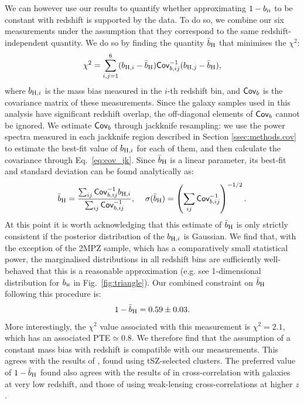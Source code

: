 \documentclass[useAMS,usenatbib]{mn2e}
\def\bH{b_{\scriptscriptstyle\rm H}}
\begin{document}
      We can however use our results to quantify whether approximating $1-\bH$ to be constant with redshift is supported by the data. To do so, we combine our six measurements under the assumption that they correspond to the same redshift-independent quantity. We do so by finding the quantity $\bar{b}_{\rm H}$ that minimises the $\chi^2$:
      \begin{equation}
        \chi^2=\sum_{i,j=1}^6 (b_{{\rm H},i}-\bar{b}_{\rm H}){\sf Cov}^{-1}_{b,ij}(b_{{\rm H},j}-\bar{b}_{\rm H}),
      \end{equation}
      where $b_{{\rm H},i}$ is the mass bias measured in the $i$-th redshift bin, and ${\sf Cov}_b$ is the covariance matrix of these measurements. Since the galaxy samples used in this analysis have significant redshift overlap, the off-diagonal elements of ${\sf Cov}_b$ cannot be ignored. We estimate ${\sf Cov}_b$ through jackknife resampling: we use the power spectra measured in each jackknife region described in Section \ref{ssec:methods.cov} to estimate the best-fit value of $b_{{\rm H},i}$ for each of them, and then calculate the covariance through Eq.\!~\ref{eq:cov_jk}. Since $\bar{b}_{\rm H}$ is a linear parameter, its best-fit and standard deviation can be found analytically as:
      \begin{equation}
        \bar{b}_{\rm H}=\frac{\sum_{ij}{\sf Cov}_{b,ij}^{-1}b_{{\rm H},i}}{\sum_{ij}{\sf Cov}^{-1}_{b,ij}},
        \hspace{12pt}
        \sigma(\bar{b}_{\rm H})=\left(\sum_{ij}{\sf Cov}^{-1}_{b,ij}\right)^{-1/2}.
      \end{equation}
      At this point it is worth acknowledging that this estimate of $\bar{b}_{\rm H}$ is only strictly consistent if the posterior distribution of the $b_{{\rm H},i}$ is Gaussian. We find that, with the exception of the 2MPZ sample, which has a comparatively small statistical power, the marginalised distributions in all redshift bins are sufficiently well-behaved that this is a reasonable approximation (e.g. see 1-dimensional distribution for $\bH$ in Fig.\!~\ref{fig:triangle}). Our combined constraint on $\bar{b}_{\rm H}$ following this procedure is:
      \begin{equation}
        1-\bar{b}_{\rm H}=0.59\pm0.03.
      \end{equation}
      More interestingly, the $\chi^2$ value associated with this measurement is $\chi^2=2.1$, which has an associated PTE$\simeq0.8$. We therefore find that the assumption of a constant mass bias with redshift is compatible with our measurements. This agrees with the results of \cite{2019A&A...626A..27S}, found using tSZ-selected clusters. The preferred value of $1-\bar{b}_{\rm H}$ found also agrees with the results of \cite{2018MNRAS.480.3928M} in cross-correlation with galaxies at very low redshift, and those of \cite{2019arXiv190707870M} using weak-lensing cross-correlations at higher $z$. 
\end{document}
